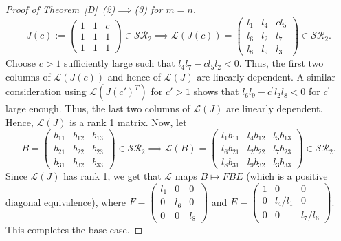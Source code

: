 \documentclass[11pt,reqno]{amsart}
\theoremstyle{plain}
\theoremstyle{definition}
\numberwithin{equation}{section}
\begin{document}
\begin{proof}[Proof of Theorem~\ref{D}~(2)$\implies$(3) for $m=n$]
	\[J(c):=\begin{pmatrix}
		1 & 1 & c \\
		1 & 1 & 1 \\
		1 & 1 & 1
	\end{pmatrix}\in \mathcal{SR}_2\implies \mathcal{L}(J(c))=\begin{pmatrix}
		l_{1} & l_{4} & cl_{5} \\
		l_{6} & l_{2} & l_{7} \\
		l_{8} & l_{9} & l_{3} 
	\end{pmatrix}\in \mathcal{SR}_2.\]
	Choose $c>1$ sufficiently large such that $l_{4}l_{7}-cl_{5}l_{2}<0$. Thus, the first two columns of $\mathcal{L}(J(c))$ and hence of $\mathcal{L}(J)$ are linearly dependent. A similar consideration using $\mathcal{L}(J(c')^T)$ for $c'>1$ shows that $l_{6}l_{9}-c^{\prime}l_{2}l_{8}<0$ for $c^{\prime}$ large enough. Thus, the last two columns of $\mathcal{L}(J)$ are linearly dependent. Hence, $\mathcal{L}(J)$ is a rank 1 matrix. Now, let
	\[B=\begin{pmatrix}
		b_{11} & b_{12} & b_{13} \\
		b_{21} & b_{22} & b_{23} \\
		b_{31} & b_{32} & b_{33}
	\end{pmatrix}\in \mathcal{SR}_2 \implies \mathcal{L}(B)=\begin{pmatrix}
		l_{1}b_{11} & l_{4}b_{12} & l_{5}b_{13} \\
		l_{6}b_{21} & l_{2}b_{22} & l_{7}b_{23} \\
		l_{8}b_{31} & l_{9}b_{32} & l_{3}b_{33}
	\end{pmatrix}\in \mathcal{SR}_2.\] 
	Since $\mathcal{L}(J)$ has rank 1, we get that $\mathcal{L}$ maps $B \mapsto FBE$ (which is a positive diagonal equivalence), where $F=\begin{pmatrix}
		l_{1} & 0 & 0 \\
		0 & l_{6} & 0 \\
		0 & 0 & l_{8}
	\end{pmatrix}$ and $E=\begin{pmatrix}
		1 & 0 & 0 \\
		0 & l_{4}/l_{1} & 0 \\
		0 & 0 & l_{7}/l_{6}
	\end{pmatrix}$. This completes the base case.
	

\end{proof}
\end{document}
